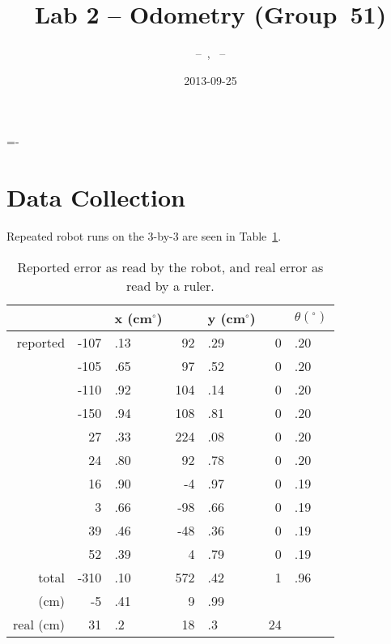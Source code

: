 \documentclass[twocolumn]{article}
\author{\bname~--~\bid, \name~--~\id}
\title{Lab 2 -- Odometry (Group~51)}
\date{2013-09-25}
\def\degree{\ensuremath{^\circ}}
\begin{document}
\abovedisplayskip=-\baselineskip

\maketitle



\section{Data Collection}

Repeated robot runs on the 3-by-3 are seen in Table~\ref{a}.

\begin{table}[htb]
\begin{center}\begin{tabular}{r r@{}l r@{}l r@{}l}
& &x (cm\degree)& &y (cm\degree)& &$\theta (\degree)$ \\
\hline
reported&-107&.13&	92&.29&	0&.20 \\
&-105&.65&	97&.52&	0&.20 \\
&-110&.92&	104&.14&	0&.20 \\
&-150&.94&	108&.81&	0&.20 \\
&27&.33&	224&.08&	0&.20 \\
&24&.80&	92&.78&	0&.20 \\
&16&.90&	-4&.97&	0&.19 \\
&3&.66&	-98&.66&	0&.19 \\
&39&.46&	-48&.36&	0&.19 \\
&52&.39&	4&.79&	0&.19 \\
\hline
total&	-310&.10&	572&.42&	1&.96 \\
(cm)&	-5&.41& 9&.99\\
real (cm)&	31&.2&	18&.3&	24
\end{tabular}\end{center}
\caption{Reported error as read by the robot, and real error as read by a ruler.}
\label{a}
\end{table}
\end{document}
